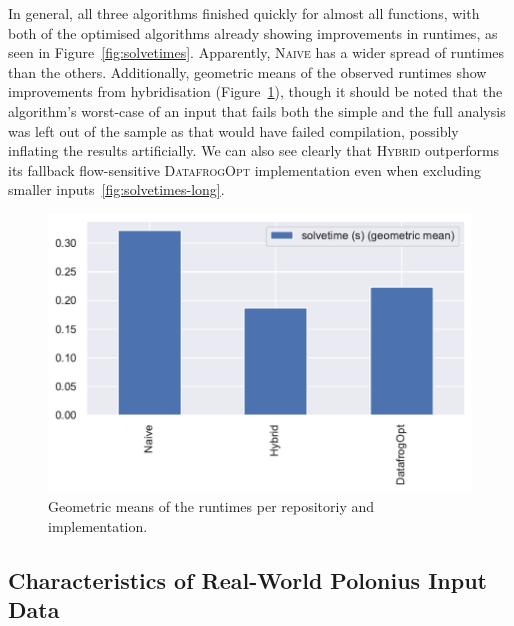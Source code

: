 \documentclass[11pt,a4paper,twoside,openany]{report}
\begin{document}
{In general, all three algorithms finished quickly for almost all functions, with
both of the optimised algorithms already showing improvements in runtimes, as
seen in Figure~\ref{fig:solvetimes}. Apparently, \textsc{Naive} has a wider
spread of runtimes than the others. Additionally, geometric means of the
observed runtimes show improvements from hybridisation
(Figure~\ref{fig:solvetimes-gmean-repo}), though it should be noted that the
algorithm's worst-case of an input that fails both the simple and the full
analysis was left out of the sample as that would have failed compilation,
possibly inflating the results artificially. We can also see clearly that
\textsc{Hybrid} outperforms its fallback flow-sensitive \textsc{DatafrogOpt}
implementation even when excluding smaller inputs~\ref{fig:solvetimes-long}.

\begin{figure}
  \includegraphics[width=0.5\linewidth]{Graphs/solvetimes_repo_gmean.pdf}
  \caption[Geometric Means of Runtimes Per Repository]{Geometric means of the
    runtimes per repositoriy and implementation.}
  \label{fig:solvetimes-gmean-repo}
\end{figure}


\subsection{Characteristics of Real-World Polonius Input
  Data}\label{sec:inputs:inputs}

}
\end{document}
